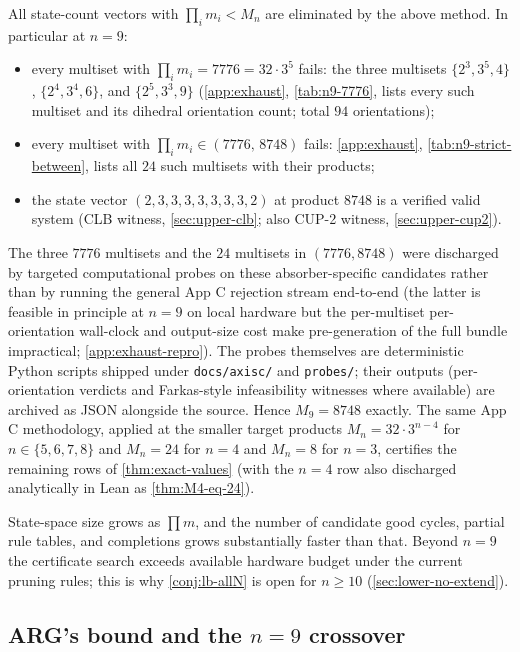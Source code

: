 \documentclass[11pt,a4paper]{article}
\theoremstyle{plain}
\theoremstyle{definition}
\newcommand{\Mn}{M_n}
\begin{document}
All state-count vectors with $\prod_i m_i < \Mn$ are eliminated by the
above method.  In particular at $n = 9$:
\begin{itemize}[leftmargin=*]
\item every multiset with $\prod_i m_i = 7776 = 32 \cdot 3^5$ fails:
the three multisets $\{2^3, 3^5, 4\}$, $\{2^4, 3^4, 6\}$, and
$\{2^5, 3^3, 9\}$ (\cref{app:exhaust}, \cref{tab:n9-7776}, lists
every such multiset and its dihedral orientation count; total $94$
orientations);
\item every multiset with $\prod_i m_i \in (7776,\, 8748)$ fails:
\cref{app:exhaust}, \cref{tab:n9-strict-between}, lists all $24$ such
multisets with their products;
\item the state vector $(2, 3, 3, 3, 3, 3, 3, 3, 2)$ at product $8748$
is a verified valid system (CLB witness, \cref{sec:upper-clb};
also CUP-2 witness, \cref{sec:upper-cup2}).
\end{itemize}
The three $7776$ multisets and the $24$ multisets in
$(7776, 8748)$ were discharged by targeted computational probes
on these absorber-specific candidates rather than by running the
general App C rejection stream end-to-end (the latter is
feasible in principle at $n = 9$ on local hardware but the
per-multiset per-orientation wall-clock and output-size cost make
pre-generation of the full bundle impractical; \cref{app:exhaust-repro}).
The probes themselves are deterministic Python scripts shipped
under \texttt{docs/axisc/} and \texttt{probes/}; their outputs
(per-orientation verdicts and Farkas-style infeasibility
witnesses where available) are archived as JSON alongside the
source.  Hence $M_9 = 8748$ exactly.  The same App C
methodology, applied at the smaller target products
$\Mn = 32 \cdot 3^{n-4}$ for $n \in \{5, 6, 7, 8\}$ and
$\Mn = 24$ for $n = 4$ and $\Mn = 8$ for $n = 3$, certifies the
remaining rows of \cref{thm:exact-values} (with the $n = 4$ row
also discharged analytically in Lean as
\cref{thm:M4-eq-24}).

State-space size grows as $\prod m$, and the number of candidate good
cycles, partial rule tables, and completions grows substantially faster
than that.  Beyond $n = 9$ the certificate search exceeds available
hardware budget under the current pruning rules; this is why
\cref{conj:lb-allN} is open for $n \ge 10$ (\cref{sec:lower-no-extend}).

\subsection{ARG's bound and the $n = 9$ crossover}\label{sec:lower-arg}
\end{document}
